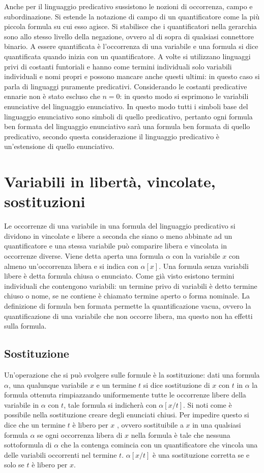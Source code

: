 Anche per il linguaggio predicativo sussistono le nozioni di occorrenza, campo e subordinazione. Si estende la notazione di campo di un quantificatore come la pi\`u piccola formula su cui esso agisce. Si 
stabilisce che i quantificatori nella gerarchia sono allo stesso livello della negazione, ovvero al di sopra di qualsiasi connettore binario. A essere quantificata \`e l'occorrenza di una variabile e una formula si dice 
quantificata quando inizia con un quantificatore. A volte si utilizzano linguaggi privi di costanti funtoriali e hanno come termini individuali solo variabili individuali e nomi propri e possono mancare anche questi 
ultimi: in questo caso si parla di linguaggi puramente predicativi.  Considerando le costanti predicative ennarie non \`e stato escluso che $n=0$: in questo modo si esprimono le variabili enunciative del 
linguaggio enunciativo. In questo modo tutti i simboli base del linguaggio enunciativo sono simboli di quello predicativo, pertanto ogni formula ben formata del linguaggio enunciativo sar\`a una formula ben 
formata di quello predicativo, secondo questa considerazione il linguaggio predicativo \`e un'estensione di quello enunciativo. 
\section{Variabili in libert\`a, vincolate, sostituzioni}
Le occorrenze di una variabile in una formula del linguaggio predicativo si dividono in vincolate e libere a seconda che siano o meno abbinate ad un quantificatore e una stessa variabile pu\`o comparire libera e 
vincolata in occorrenze diverse. Viene detta aperta una formula $\alpha$ con la variabile $x$ con almeno un'occorrenza libera e si indica con $\alpha[x]$. Una formula senza variabili libere \`e detta formula 
chiusa o enunciato. Come gi\`a visto esistono termini individuali che contengono variabili: un termine privo di variabili \`e detto termine chiuso o nome, se ne contiene \`e chiamato termine aperto o forma 
nominale. La definizione di formula ben formata permette la quantificazione vacua, ovvero la quantificazione di una variabile che non occorre libera, ma questo non ha effetti sulla formula. 
\subsection{Sostituzione}
Un'operazione che si pu\`o svolgere sulle formule \`e la sostituzione: dati una formula $\alpha$, una qualunque variabile $x$ e un termine $t$ si dice sostituzione di $x$ con $t$ in $\alpha$ la formula ottenuta 
rimpiazzando uniformemente tutte le occorrenze libere della variabile in $\alpha$ con $t$, tale formula si indicher\`a con $\alpha[x/t]$. Si noti come \`e possibile nella sostituzione creare degli enunciati chiusi. 
Per impedire questo si dice che un termine $t$ \`e libero per $x$ , ovvero sostituibile a $x$ in una qualsiasi formula $\alpha$ se ogni occorrenza libera di $x$ nella formula \`e tale che nessuna sottoformula di $
\alpha$ che la contenga comincia con un quantificatore che vincola una delle variabili occorrenti nel termine $t$. $\alpha[x/t]$ \`e una sostituzione corretta se e solo se $t$ \`e libero per $x$.
